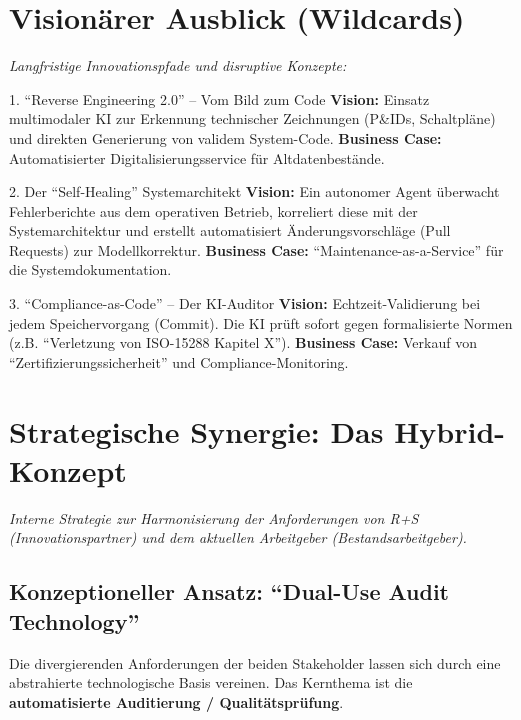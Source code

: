 \documentclass[a4paper,11pt]{article}
\begin{document}
\newpage

\section{Visionärer Ausblick (Wildcards)}
\textit{Langfristige Innovationspfade und disruptive Konzepte:}

\begin{wildcardbox}{1. \enquote{Reverse Engineering 2.0} -- Vom Bild zum Code}
    \textbf{Vision:} Einsatz multimodaler KI zur Erkennung technischer Zeichnungen (P\&IDs, Schaltpläne) und direkten Generierung von validem System-Code.
    \textbf{Business Case:} Automatisierter Digitalisierungsservice für Altdatenbestände.
\end{wildcardbox}

\vspace{0.3cm}

\begin{wildcardbox}{2. Der \enquote{Self-Healing} Systemarchitekt}
    \textbf{Vision:} Ein autonomer Agent überwacht Fehlerberichte aus dem operativen Betrieb, korreliert diese mit der Systemarchitektur und erstellt automatisiert Änderungsvorschläge (Pull Requests) zur Modellkorrektur.
    \textbf{Business Case:} \enquote{Maintenance-as-a-Service} für die Systemdokumentation.
\end{wildcardbox}

\vspace{0.3cm}

\begin{wildcardbox}{3. \enquote{Compliance-as-Code} -- Der KI-Auditor}
    \textbf{Vision:} Echtzeit-Validierung bei jedem Speichervorgang (Commit). Die KI prüft sofort gegen formalisierte Normen (z.B. \enquote{Verletzung von ISO-15288 Kapitel X}).
    \textbf{Business Case:} Verkauf von \enquote{Zertifizierungssicherheit} und Compliance-Monitoring.
\end{wildcardbox}

\newpage

\appendix

\section{Strategische Synergie: Das Hybrid-Konzept}
\textit{Interne Strategie zur Harmonisierung der Anforderungen von R+S (Innovationspartner) und dem aktuellen Arbeitgeber (Bestandsarbeitgeber).}

\subsection*{Konzeptioneller Ansatz: \enquote{Dual-Use Audit Technology}}
Die divergierenden Anforderungen der beiden Stakeholder lassen sich durch eine abstrahierte technologische Basis vereinen. Das Kernthema ist die \textbf{automatisierte Auditierung / Qualitätsprüfung}.
\end{document}
